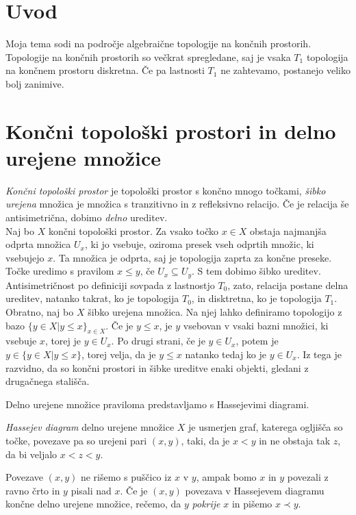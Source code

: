 
\section{Uvod}
Moja tema sodi na področje algebraične topologije na končnih prostorih. Topologije na končnih prostorih so večkrat spregledane, saj je vsaka $T_1$ topologija
na končnem prostoru diskretna. Če pa lastnosti $T_1$ ne zahtevamo, postanejo veliko bolj
zanimive.

\section{Končni topološki prostori in delno urejene množice}

\textit{Končni topološki prostor} je topološki prostor s končno mnogo točkami, \textit{šibko urejena} množica je množica s tranzitivno in z refleksivno relacijo. Če je relacija še antisimetrična, dobimo \textit{delno} ureditev.
\\ \indent Naj bo $X$ končni topološki prostor. Za vsako točko $x \in X$ obstaja najmanjša odprta množica $U_x$, ki jo
vsebuje, oziroma presek vseh odprtih množic, ki vsebujejo $x$. Ta množica je odprta, saj je topologija zaprta za končne preseke.
    Točke uredimo s pravilom $ x\le y \text{, če } U_x \subseteq  U_y$. S tem dobimo šibko ureditev. Antisimetričnost po definiciji sovpada z lastnostjo $T_0$, zato, relacija postane delna ureditev, natanko takrat, ko je topologija $T_0$, in disktretna, ko je topologija $T_1$.
    \\ \indent Obratno, naj bo $X$ šibko urejena množica. Na njej lahko definiramo topologijo z bazo $\{y \in X | y\le x\}_{x \in X}$. Če je
$y \le x$, je $y$ vsebovan v vsaki bazni množici, ki vsebuje $x$, torej je $y \in U_x$. Po drugi strani, če je $y\in
U_x$, potem je $y \in \{y \in X | y \le x\}$, torej velja, da je $y \le x$ natanko tedaj ko je $y \in U_x$. Iz tega je razvidno, da so končni prostori in šibke ureditve enaki objekti, gledani z drugačnega stališča.

Delno urejene množice praviloma predstavljamo s Hassejevimi diagrami.

\begin{definicija}
    \textit{Hassejev diagram} delno urejene množice $X$ je usmerjen graf, katerega ogljišča so točke, povezave pa so urejeni pari $(x,y)$, taki, da je  $x<y$ in ne obstaja tak $z$, da bi veljalo $x<z<y$.
\end{definicija}

Povezave $(x,y)$ ne rišemo s puščico iz $x$ v $y$, ampak bomo $x$ in $y$ povezali z ravno črto in $y$ pisali nad $x$. Če je $(x,y)$ povezava v Hassejevem diagramu končne delno urejene množice, rečemo, da $y$ \textit{pokrije} $x$ in pišemo $x\prec y$.


